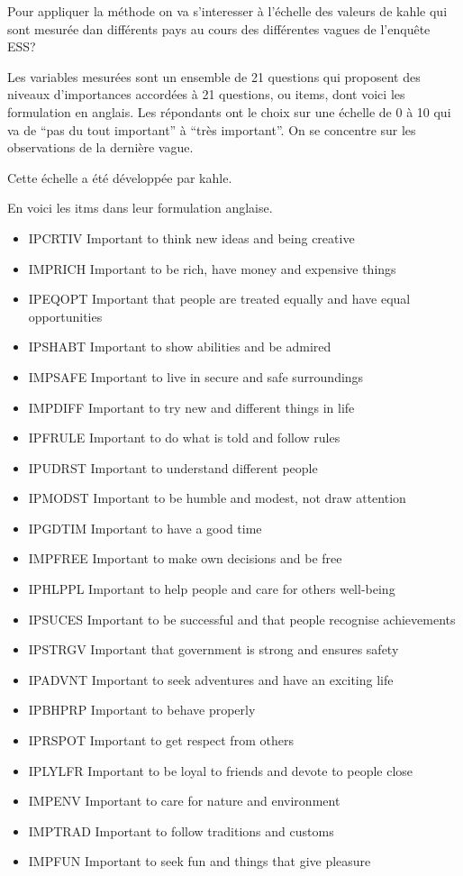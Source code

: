\documentclass[
]{book}
\providecommand{\tightlist}{%
  \setlength{\itemsep}{0pt}\setlength{\parskip}{0pt}}
\begin{document}
Pour appliquer la méthode on va s'interesser à l'échelle des valeurs de kahle qui sont mesurée dan différents pays au cours des différentes vagues de l'enquête ESS?

Les variables mesurées sont un ensemble de 21 questions qui proposent des niveaux d'importances accordées à 21 questions, ou items, dont voici les formulation en anglais. Les répondants ont le choix sur une échelle de 0 à 10 qui va de ``pas du tout important'' à ``très important''. On se concentre sur les observations de la dernière vague.

Cette échelle a été développée par kahle.

En voici les itms dans leur formulation anglaise.

\begin{itemize}
\tightlist
\item
  IPCRTIV Important to think new ideas and being creative
\item
  IMPRICH Important to be rich, have money and expensive things
\item
  IPEQOPT Important that people are treated equally and have equal opportunities
\item
  IPSHABT Important to show abilities and be admired
\item
  IMPSAFE Important to live in secure and safe surroundings
\item
  IMPDIFF Important to try new and different things in life
\item
  IPFRULE Important to do what is told and follow rules
\item
  IPUDRST Important to understand different people
\item
  IPMODST Important to be humble and modest, not draw attention
\item
  IPGDTIM Important to have a good time
\item
  IMPFREE Important to make own decisions and be free
\item
  IPHLPPL Important to help people and care for others well-being
\item
  IPSUCES Important to be successful and that people recognise achievements
\item
  IPSTRGV Important that government is strong and ensures safety
\item
  IPADVNT Important to seek adventures and have an exciting life
\item
  IPBHPRP Important to behave properly
\item
  IPRSPOT Important to get respect from others
\item
  IPLYLFR Important to be loyal to friends and devote to people close
\item
  IMPENV Important to care for nature and environment
\item
  IMPTRAD Important to follow traditions and customs
\item
  IMPFUN Important to seek fun and things that give pleasure
\end{itemize}
\end{document}
